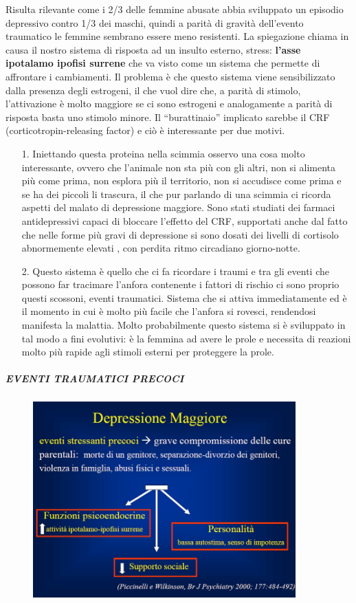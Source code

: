 Risulta rilevante come i 2/3 delle femmine abusate abbia sviluppato un
episodio depressivo contro 1/3 dei maschi, quindi a parità di gravità
dell'evento traumatico le femmine sembrano essere meno resistenti. La
spiegazione chiama in causa il nostro sistema di risposta ad un insulto
esterno, stress: \textbf{l'asse ipotalamo ipofisi surrene} che va visto
come un sistema che permette di affrontare i cambiamenti. Il problema è
che questo sistema viene sensibilizzato dalla presenza degli estrogeni,
il che vuol dire che, a parità di stimolo, l'attivazione è molto
maggiore se ci sono estrogeni e analogamente a parità di risposta basta
uno stimolo minore. Il ``burattinaio'' implicato sarebbe il CRF
(corticotropin-releasing factor) e ciò è interessante per due motivi.

\begin{itemize}
\item[1.]
  Iniettando questa proteina nella scimmia osservo una cosa molto
  interessante, ovvero che l'animale non sta più con gli altri, non si
  alimenta più come prima, non esplora più il territorio, non si
  accudisce come prima e se ha dei piccoli li trascura, il che pur
  parlando di una scimmia ci ricorda aspetti del malato di depressione
  maggiore. Sono stati studiati dei farmaci antidepressivi capaci di
  bloccare l'effetto del CRF, supportati anche dal fatto che nelle forme
  più gravi di depressione si sono dosati dei livelli di cortisolo
  abnormemente elevati , con perdita ritmo circadiano giorno-notte.
\item[2.]
  Questo sistema è quello che ci fa ricordare i traumi e tra gli eventi
  che possono far tracimare l'anfora contenente i fattori di rischio ci
  sono proprio questi scossoni, eventi traumatici. Sistema che si attiva
  immediatamente ed è il momento in cui è molto più facile che l'anfora
  si rovesci, rendendosi manifesta la malattia. Molto probabilmente
  questo sistema si è sviluppato in tal modo a fini evolutivi: è la
  femmina ad avere le prole e necessita di reazioni molto più rapide
  agli stimoli esterni per proteggere la prole.
  \end{itemize}
  
\subparagraph{EVENTI TRAUMATICI PRECOCI}

\begin{figure}[!ht]
\centering
	\includegraphics[width=0.9\textwidth]{02/image6.jpeg}
\end{figure}

